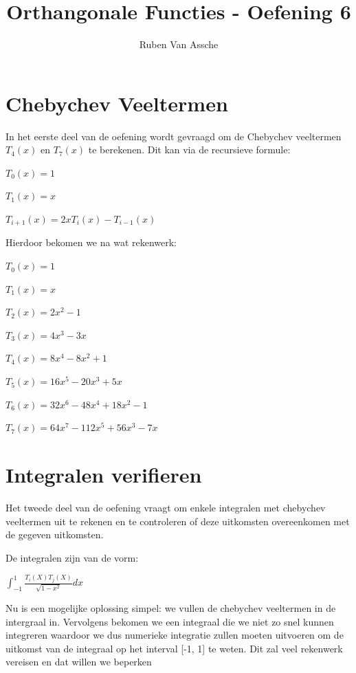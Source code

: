 \documentclass{article}
\author{Ruben Van Assche}
\title{Orthangonale Functies - Oefening 6}
\begin{document}
 \maketitle
 \begin{flushleft}
\section{Chebychev Veeltermen}
 
In het eerste deel van de oefening wordt gevraagd om de Chebychev veeltermen $T_{4}(x)$ en $T_{7}(x) $ te berekenen.  Dit kan via de recursieve formule:
\newline

$ T_{0}(x) = 1$

$ T_{1}(x) = x$

$ T_{i+1}(x) = 2xT_{i}(x) - T_{i-1}(x)$
\newline

Hierdoor bekomen we na wat rekenwerk:
\newline

$ T_{0}(x) = 1$

$ T_{1}(x) = x$

$ T_{2}(x) = 2x^{2} - 1$

$ T_{3}(x) = 4x^{3} - 3x$

$ T_{4}(x) = 8x^{4} - 8x^{2} + 1$

$ T_{5}(x) = 16x^{5} - 20x^{3} + 5x$

$ T_{6}(x) = 32x^{6} - 48x^{4} + 18x^{2} - 1$

$ T_{7}(x) = 64x^{7} - 112x^{5} + 56x^{3} - 7x$
\section{Integralen verifieren}
 
Het tweede deel van de oefening vraagt om enkele integralen met chebychev veeltermen uit te rekenen en te controleren of deze uitkomsten overeenkomen met de gegeven uitkomsten.
\newline

De integralen zijn van de vorm:
\newline

$ \int_{-1}^{1}  \frac{T_{i}(X)T_{j}(X)}{\sqrt{1-x^{2}}} dx $
\newline

Nu is een mogelijke oplossing simpel: we vullen de chebychev veeltermen in de intergraal in. Vervolgens bekomen we een integraal die we niet zo snel kunnen integreren waardoor we dus numerieke integratie zullen moeten uitvoeren om de uitkomst van de integraal op het interval [-1, 1] te weten. Dit zal veel rekenwerk vereisen en dat willen we beperken
\newline


\end{flushleft}
\end{document}
